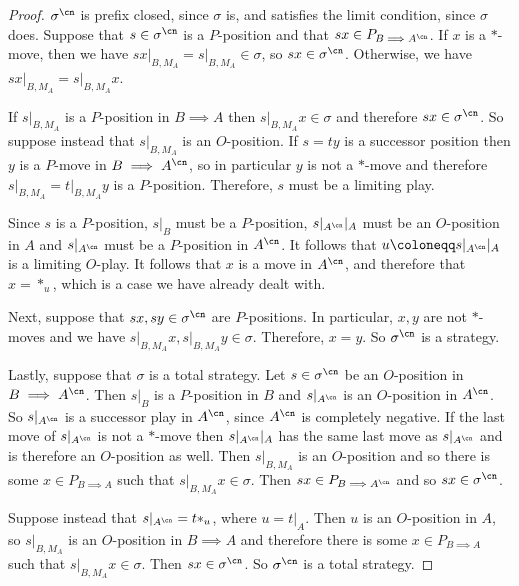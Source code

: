 \documentclass[11pt]{article} %
\begin{document}
\begin{proof}
  $\sigma^{\cn}$ is prefix closed, since $\sigma$ is, and satisfies the limit condition, since $\sigma$ does.  Suppose that $s\in\sigma^{\cn}$ is a $P$-position and that $sx\in P_{B\implies A^{\cn}}$.  If $x$ is a $*$-move, then we have $sx\vert_{B,M_A}=s\vert_{B,M_A}\in\sigma$, so $sx\in\sigma^{\cn}$.  Otherwise, we have $sx\vert_{B,M_A}=s\vert_{B,M_A}x$.  

  If $s\vert_{B,M_A}$ is a $P$-position in $B\implies A$ then $s\vert_{B,M_A}x\in\sigma$ and therefore $sx\in\sigma^{\cn}$.  So suppose instead that $s\vert_{B,M_A}$ is an $O$-position.  If $s=ty$ is a successor position then $y$ is a $P$-move in $B\implies A^{\cn}$, so in particular $y$ is not a $*$-move and therefore $s\vert_{B,M_A}=t\vert_{B,M_A}y$ is a $P$-position.  Therefore, $s$ must be a limiting play.  

  Since $s$ is a $P$-position, $s\vert_B$ must be a $P$-position, $s\vert_{A^{\cn}}\vert_A$ must be an $O$-position in $A$ and $s\vert_{A^{\cn}}$ must be a $P$-position in $A^{\cn}$.  It follows that $u\coloneqq s\vert_{A^{\cn}}\vert_A$ is a limiting $O$-play.  It follows that $x$ is a move in $A^{\cn}$, and therefore that $x=*_u$, which is a case we have already dealt with.

  Next, suppose that $sx, sy\in\sigma^{\cn}$ are $P$-positions.  In particular, $x,y$ are not $*$-moves and we have $s\vert_{B,M_A}x,s\vert_{B,M_A}y\in\sigma$.  Therefore, $x=y$.  So $\sigma^{\cn}$ is a strategy.

  Lastly, suppose that $\sigma$ is a total strategy.  Let $s\in\sigma^{\cn}$ be an $O$-position in $B\implies A^{\cn}$.  Then $s\vert_B$ is a $P$-position in $B$ and $s\vert_{A^{\cn}}$ is an $O$-position in $A^{\cn}$.  So $s\vert_{A^{\cn}}$ is a successor play in $A^{\cn}$, since $A^{\cn}$ is completely negative.  If the last move of $s\vert_{A^{\cn}}$ is not a $*$-move then $s\vert_{A^{\cn}}\vert_A$ has the same last move as $s\vert_{A^{\cn}}$ and is therefore an $O$-position as well.  Then $s\vert_{B,M_A}$ is an $O$-position and so there is some $x\in P_{B\implies A}$ such that $s\vert_{B,M_A}x\in\sigma$. Then $sx\in P_{B\implies A^{\cn}}$ and so $sx\in\sigma^{\cn}$.  

  Suppose instead that $s\vert_{A^{\cn}}=t*_u$, where $u=t\vert_A$.  Then $u$ is an $O$-position in $A$, so $s\vert_{B,M_A}$ is an $O$-position in $B\implies A$ and therefore there is some $x\in P_{B\implies A}$ such that $s\vert_{B,M_A}x\in\sigma$.  Then $sx\in\sigma^{\cn}$.  So $\sigma^{\cn}$ is a total strategy.


\end{proof}
\end{document}
